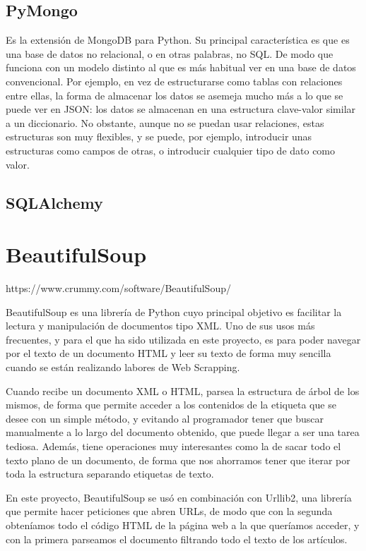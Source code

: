 \subsection{PyMongo}
Es la extensión de MongoDB para Python. Su principal característica es que es una base de datos no relacional, o en otras palabras, no SQL. De modo que funciona con un modelo distinto al que es más habitual ver en una base de datos convencional. 
Por ejemplo, en vez de estructurarse como tablas con relaciones entre ellas, la forma de almacenar los datos se asemeja mucho más a lo que se puede ver en JSON: los datos se almacenan en una estructura clave-valor similar a un diccionario. 
No obstante, aunque no se puedan usar relaciones, estas estructuras son muy flexibles, y se puede, por ejemplo, introducir unas estructuras como campos de otras, o introducir cualquier tipo de dato como valor.
\subsection{SQLAlchemy}

\section{BeautifulSoup}
https://www.crummy.com/software/BeautifulSoup/


BeautifulSoup es una librería de Python cuyo principal objetivo es facilitar la lectura y manipulación de documentos tipo XML. Uno de sus usos más frecuentes, y para el que ha sido utilizada en este proyecto, es para poder navegar por el texto de un documento HTML y leer su texto de forma muy sencilla cuando se están realizando labores de Web Scrapping. 

Cuando recibe un documento XML o HTML, parsea la estructura de árbol de los mismos, de forma que permite acceder a los contenidos de la etiqueta que se desee con un simple método, y evitando al programador tener que buscar manualmente a lo largo del documento obtenido, que puede llegar a ser una tarea tediosa. Además, tiene operaciones muy interesantes como la de sacar todo el texto plano de un documento, de forma que nos ahorramos tener que iterar por toda la estructura separando etiquetas de texto.

En este proyecto, BeautifulSoup se usó en combinación con Urllib2, una librería que permite hacer peticiones que abren URLs, de modo que con la segunda obteníamos todo el código HTML de la página web a la que queríamos acceder, y con la primera parseamos el documento filtrando todo el texto de los artículos.


